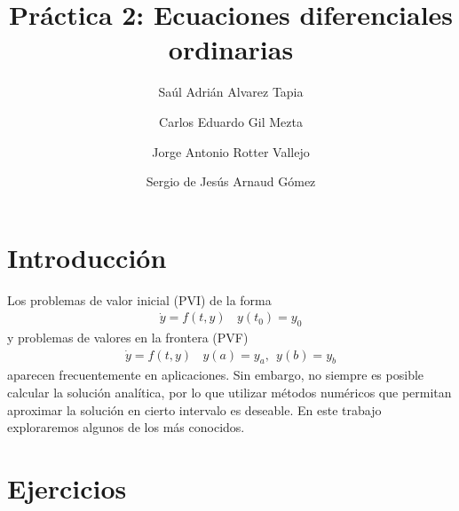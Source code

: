 \documentclass[spanish]{article}
\begin{document}
\author{Saúl Adrián Alvarez Tapia \and Carlos Eduardo Gil Mezta \and Jorge Antonio Rotter Vallejo \and Sergio de Jesús Arnaud Gómez}

\title{\Huge Práctica 2: Ecuaciones diferenciales ordinarias}
\date{}
\maketitle

\noindent
\section{Introducción}
Los problemas de valor inicial (PVI) de la forma
\begin{align*}
\dot{y} = f(t,y) \ \ \ \ y(t_0) = y_0
\end{align*}
y problemas de valores en la frontera (PVF)
\begin{align*}
\dot{y} = f(t,y) \ \ \ \ y(a) = y_a, \ \ y(b) = y_b
\end{align*}
aparecen frecuentemente en aplicaciones. Sin embargo, no siempre es posible calcular
la solución analítica, por lo que utilizar métodos numéricos que permitan aproximar
la solución en cierto intervalo es deseable. En este trabajo exploraremos algunos de
los más conocidos.

\section{Ejercicios}
\end{document}

